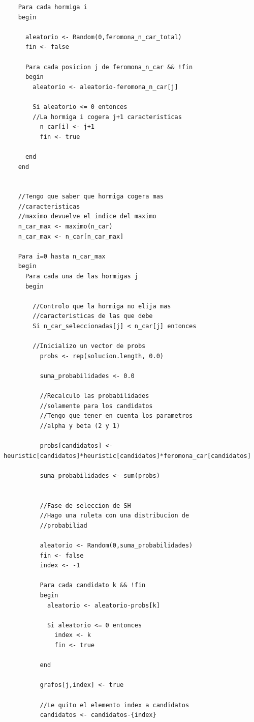 \begin{lstlisting}
    Para cada hormiga i
    begin
  
      aleatorio <- Random(0,feromona_n_car_total)
      fin <- false
  
      Para cada posicion j de feromona_n_car && !fin
      begin
        aleatorio <- aleatorio-feromona_n_car[j]
  
        Si aleatorio <= 0 entonces
        //La hormiga i cogera j+1 caracteristicas
          n_car[i] <- j+1
          fin <- true
  
      end
    end
  
  
    //Tengo que saber que hormiga cogera mas
    //caracteristicas
    //maximo devuelve el indice del maximo
    n_car_max <- maximo(n_car)
    n_car_max <- n_car[n_car_max]
  
    Para i=0 hasta n_car_max
    begin
      Para cada una de las hormigas j
      begin
  
        //Controlo que la hormiga no elija mas
        //caracteristicas de las que debe
        Si n_car_seleccionadas[j] < n_car[j] entonces
  
        //Inicializo un vector de probs
          probs <- rep(solucion.length, 0.0)
  
          suma_probabilidades <- 0.0
  
          //Recalculo las probabilidades
          //solamente para los candidatos
          //Tengo que tener en cuenta los parametros
          //alpha y beta (2 y 1)
  
          probs[candidatos] <- heuristic[candidatos]*heuristic[candidatos]*feromona_car[candidatos]
  
          suma_probabilidades <- sum(probs)
  

          //Fase de seleccion de SH
          //Hago una ruleta con una distribucion de
          //probabiliad
  
          aleatorio <- Random(0,suma_probabilidades)
          fin <- false
          index <- -1
  
          Para cada candidato k && !fin
          begin
            aleatorio <- aleatorio-probs[k]
  
            Si aleatorio <= 0 entonces
              index <- k
              fin <- true
  
          end
  
          grafos[j,index] <- true
  
          //Le quito el elemento index a candidatos
          candidatos <- candidatos-{index}
  

\end{lstlisting}
